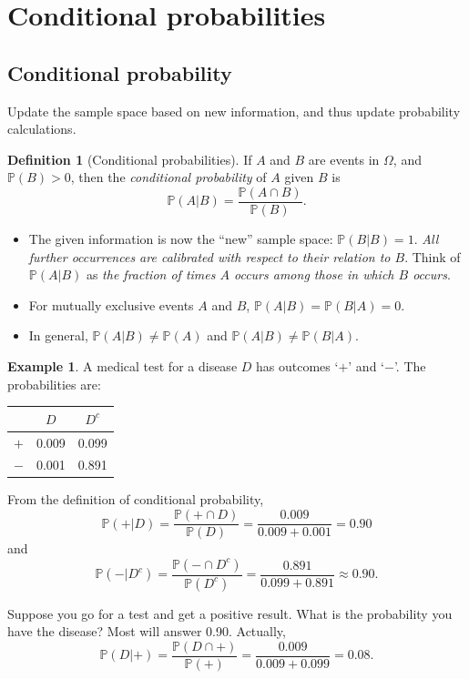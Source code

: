 \documentclass[
]{book}
\providecommand{\tightlist}{%
  \setlength{\itemsep}{0pt}\setlength{\parskip}{0pt}}
\newcommand{\bbP}{\mathbb{P}}
\theoremstyle{definition}
\newtheorem{definition}{Definition}[chapter]
\theoremstyle{definition}
\newtheorem{example}{Example}[chapter]
\theoremstyle{definition}
\theoremstyle{definition}
\theoremstyle{remark}
\begin{document}
\hypertarget{conditional-probabilities}{%
\section{Conditional probabilities}\label{conditional-probabilities}}

\hypertarget{conditional-probability}{%
\subsection{Conditional probability}\label{conditional-probability}}

Update the sample space based on new information, and thus update probability calculations.

\begin{definition}[Conditional probabilities]
If \(A\) and \(B\) are events in \(\Omega\), and \(\bbP(B)>0\), then the \emph{conditional probability} of \(A\) given \(B\) is
\[
  \bbP(A | B) = \frac{\bbP(A \cap B)}{\bbP(B)}.
\]
\end{definition}

\begin{itemize}
\tightlist
\item
  The given information is now the ``new'' sample space: \(\bbP(B | B) = 1\). \emph{All further occurrences are calibrated with respect to their relation to \(B\)}. Think of \(\bbP(A | B)\) as \emph{the fraction of times \(A\) occurs among those in which \(B\) occurs}.
\item
  For mutually exclusive events \(A\) and \(B\), \(\bbP(A | B)=\bbP(B | A)=0\).
\item
  In general, \(\bbP(A | B) \neq \bbP(A)\) and \(\bbP(A | B) \neq \bbP(B | A)\).
\end{itemize}

\begin{example}
A medical test for a disease \(D\) has outcomes `\(+\)' and `\(-\)'. The probabilities are:

\begin{longtable}[]{@{}lcc@{}}
\toprule
& \(D\) & \(D^c\) \\
\midrule
\endhead
\(+\) & 0.009 & 0.099 \\
\(-\) & 0.001 & 0.891 \\
\bottomrule
\end{longtable}

From the definition of conditional probability,
\[
  \bbP(+|D) = \frac{\bbP(+ \cap D)}{\bbP(D)} = \frac{0.009}{0.009 + 0.001} = 0.90
\]
and
\[
  \bbP(-|D^c) = \frac{\bbP(- \cap D^c)}{\bbP(D^c)} = \frac{0.891}{0.099 + 0.891} \approx 0.90.
\]

Suppose you go for a test and get a positive result.
What is the probability you have the disease?
Most will answer 0.90.
Actually,
\[
  \bbP(D|+) = \frac{\bbP(D \cap +)}{\bbP(+)} = \frac{0.009}{0.009 + 0.099} = 0.08.
\]
\end{example}
\end{document}
